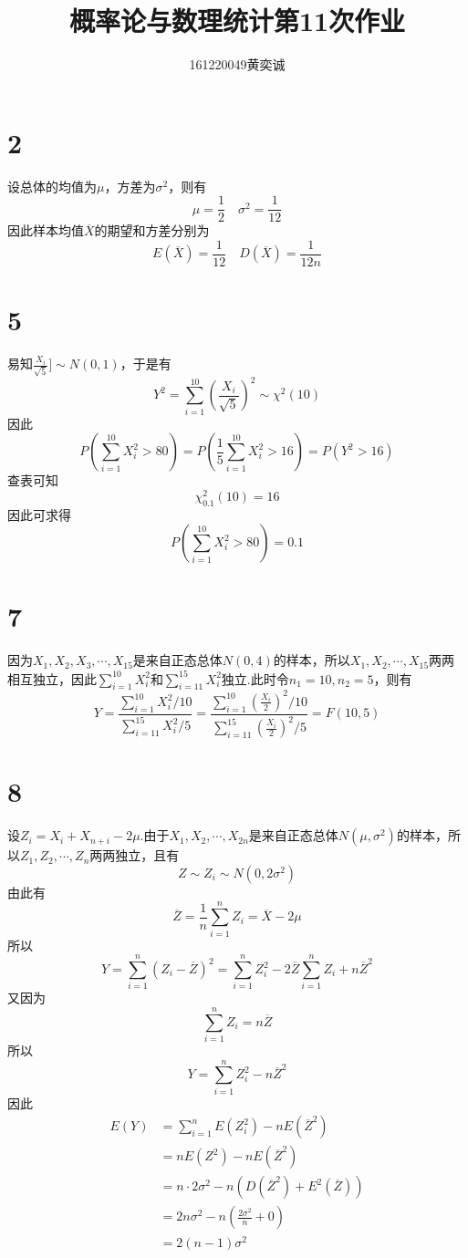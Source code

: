 \documentclass[twocolumn]{article}
\begin{document}
	\begin{CJK}{UTF8}{gbsn}		
			\title{概率论与数理统计第11次作业}
			\author{161220049\quad 黄奕诚}
			\maketitle
			
			\section*{2}
				设总体的均值为$\mu$，方差为$\sigma^2$，则有\[\mu=\frac{1}{2}\quad \sigma^2=\frac{1}{12}\]因此样本均值$\overline{X}$的期望和方差分别为\[E(\overline{X})=\frac{1}{12}\quad D(\overline{X})=\frac{1}{12n}\]
			\section*{5}
				易知$\frac{X_i}{\sqrt{5}}]\sim N(0,1)$，于是有\[Y^2=\sum_{i=1}^{10}(\frac{X_i}{\sqrt{5}})^2\sim\chi^2(10)\]因此\[P(\sum_{i=1}^{10}X_i^2>80)=P(\frac{1}{5}\sum_{i=1}^{10}X_i^2>16)=P(Y^2>16)\]查表可知\[\chi_{0.1}^2(10)=16\]因此可求得\[P(\sum_{i=1}^{10}X_i^2>80)=0.1\]
			\section*{7}
				因为$X_1,X_2,X_3,\cdots,X_{15}$是来自正态总体$N(0,4)$的样本，所以$X_1,X_2,\cdots,X_{15}$两两相互独立，因此$\sum_{i=1}^{10}X_i^2$和$\sum_{i=11}^{15}X_i^2$独立.此时令$n_1=10,n_2=5$，则有\[Y=\frac{\sum_{i=1}^{10}X_i^2/10}{\sum_{i=11}^{15}X_i^2/5}=\frac{\sum_{i=1}^{10}(\frac{X_i}{2})^2/10}{\sum_{i=11}^{15}(\frac{X_i}{2})^2/5}=F(10,5)\]
			\section*{8}
				设$Z_i= X_i+X_{n+i}-2\mu$.由于$X_1,X_2,\cdots,X_{2n}$是来自正态总体$N(\mu,\sigma^2)$的样本，所以$Z_1,Z_2,\cdots,Z_n$两两独立，且有\[Z\sim Z_i\sim N(0,2\sigma^2)\]由此有\[\overline{Z}=\frac{1}{n}\sum_{i=1}^{n}Z_i=\overline{X}-2\mu\]所以\[Y=\sum_{i=1}^{n}(Z_i-\overline{Z})^2=\sum_{i=1}^{n}Z_i^2-2\overline{Z}\sum_{i=1}^{n}Z_i+n\overline{Z}^2\]又因为\[\sum_{i=1}^{n}Z_i=n\overline{Z}\]所以\[Y=\sum_{i=1}^{n}Z_i^2-n\overline{Z}^2\]因此\begin{align*}
					E(Y) & = \sum_{i=1}^{n}E(Z_i^2)-nE(\overline{Z}^2)\\
					& = nE(Z^2)-nE(\overline{Z}^2)\\
					& = n\cdot2\sigma^2-n(D(\overline{Z}^2)+E^2(\overline{Z}))\\
					& = 2n\sigma^2-n(\frac{2\sigma^2}{n}+0)\\
					& = 2(n-1)\sigma^2
				\end{align*}

\end{CJK}
\end{document}
